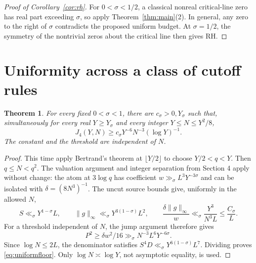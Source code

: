 \documentclass[11pt,a4paper]{article}
\newtheorem{theorem}{Theorem}[section]
\theoremstyle{definition}
\theoremstyle{remark}
\begin{document}
\begin{proof}[Proof of Corollary~\ref{cor:rh}]
For \(0<\sigma<1/2\), a classical nonreal critical-line zero has
real part exceeding \(\sigma\), so apply Theorem~\ref{thm:main}(2).
In general, any zero to the right of \(\sigma\) contradicts the
proposed uniform budget. At \(\sigma=1/2\), the symmetry of the
nontrivial zeros about the critical line then gives RH.
\end{proof}

\section{Uniformity across a class of cutoff rules}

\begin{theorem}\label{thm:uniformcutoff}
For every fixed \(0<\sigma<1\), there are \(c_\sigma>0,Y_\sigma\)
such that, simultaneously for every real \(Y\ge Y_\sigma\) and
every integer \(Y\le N\le Y^2/8\),
\begin{equation}
 J_4(Y,N)\ge c_\sigma Y^{-6}N^{-3}(\log Y)^{-1}.
 \label{eq:uniformfloor}
\end{equation}
The constant and the threshold are independent of \(N\).
\end{theorem}
\begin{proof}
This time apply Bertrand's theorem at \(\lfloor Y/2\rfloor\) to
choose \(Y/2<q<Y\). Then \(q\le N<q^2\). The valuation argument
and integer separation from Section 4 apply without change:
the atom at \(3\log q\) has coefficient
\(w\gg_\sigma L^3Y^{-3\sigma}\) and can be isolated with
\(\delta=(8N^3)^{-1}\).
The uncut source bounds give, uniformly in the allowed \(N\),
\[
 S\ll_\sigma Y^{1-\sigma}L,\qquad
 \|g\|_\infty\ll_\sigma Y^{3(1-\sigma)}L^2,\qquad
 \frac{\delta\|g\|_\infty}{w}
 \ll_\sigma\frac{Y^3}{N^3L}\le \frac{C_\sigma}{L}.
\]
For a threshold independent of \(N\), the jump argument therefore
gives
\[
 P^2\ge\delta w^2/16
 \gg_\sigma N^{-3}L^6Y^{-6\sigma}.
\]
Since \(\log N\le2L\), the denominator satisfies
\(S^4D\ll_\sigma Y^{6(1-\sigma)}L^7\).
Dividing proves \eqref{eq:uniformfloor}.
Only \(\log N\asymp\log Y\), not asymptotic equality, is used.
\end{proof}
\end{document}
